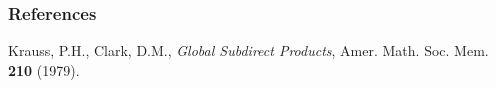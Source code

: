 \documentclass[12pt]{beamer}
\begin{document}
\begin{frame}%
\frametitle{References}

\begin{thebibliography}{CamVag2009}

{}\textrm{Krauss, P.H., Clark, D.M.}, 
\textit{Global Subdirect Products}, Amer. Math. Soc. Mem. \textbf{210} (1979).


\end{thebibliography}

\end{frame}

\begin{frame}
\begin{figure}[center]
\end{figure}
\end{frame}
\end{document}
